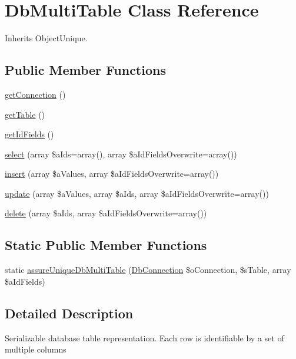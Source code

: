 \hypertarget{class_db_multi_table}{\section{Db\-Multi\-Table Class Reference}
\label{class_db_multi_table}
}


Inherits Object\-Unique.

\subsection*{Public Member Functions}
\begin{DoxyCompactItemize}
\item 
\hyperlink{class_db_multi_table_a03eb573ad50f1efe1605fb6d38ea8c5f}{get\-Connection} ()
\item 
\hyperlink{class_db_multi_table_ab2315d078fcfbc53238517f49754e919}{get\-Table} ()
\item 
\hyperlink{class_db_multi_table_af84a3c49cb55982e2009e4b88bdc8d60}{get\-Id\-Fields} ()
\item 
\hyperlink{class_db_multi_table_ac39230ed0f7118105b0fc0bbc1104d99}{select} (array \$a\-Ids=array(), array \$a\-Id\-Fields\-Overwrite=array())
\item 
\hyperlink{class_db_multi_table_ab9d8600e6f8f189e5d7e729881e8dc60}{insert} (array \$a\-Values, array \$a\-Id\-Fields\-Overwrite=array())
\item 
\hyperlink{class_db_multi_table_aa800394ffdf5930bc022c5c8f5e88d24}{update} (array \$a\-Values, array \$a\-Ids, array \$a\-Id\-Fields\-Overwrite=array())
\item 
\hyperlink{class_db_multi_table_a0da134659049af2a3b7192bbfeace9ba}{delete} (array \$a\-Ids, array \$a\-Id\-Fields\-Overwrite=array())
\end{DoxyCompactItemize}
\subsection*{Static Public Member Functions}
\begin{DoxyCompactItemize}
\item 
static \hyperlink{class_db_multi_table_ae3484d6d58a49e38148c1456fe195657}{assure\-Unique\-Db\-Multi\-Table} (\hyperlink{class_db_connection}{Db\-Connection} \$o\-Connection, \$s\-Table, array \$a\-Id\-Fields)
\end{DoxyCompactItemize}


\subsection{Detailed Description}
Serializable database table representation. Each row is identifiable by a set of multiple columns

